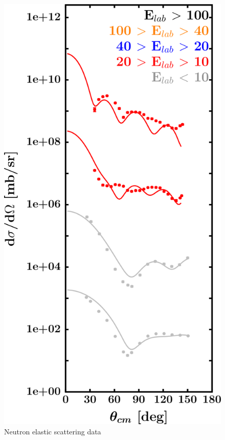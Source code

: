 \begin{figure}[H]
\begin{minipage}{0.45\textwidth}
        \includegraphics[width=1.0\textwidth]{figures/ca48_neutronElastic.png}
        \caption{Neutron elastic scattering data}
        \label{DOMFitData_ca48_neutron_elastic}
    \end{minipage}
\end{figure}

